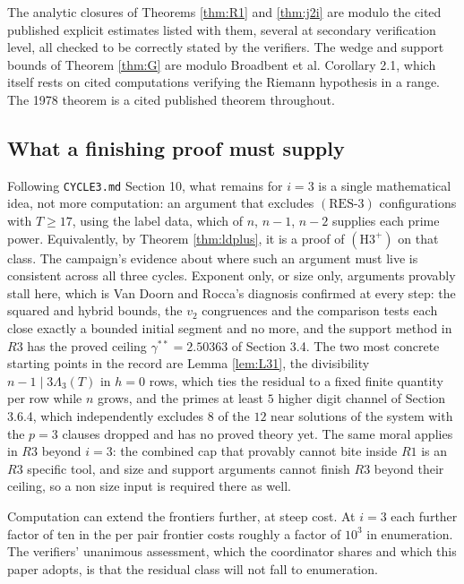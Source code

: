 \documentclass[11pt]{article}
\theoremstyle{remark}
\newcommand{\RESthree}{\ensuremath{\mathrm{(RES\text{-}3)}}}
\begin{document}
The analytic closures of Theorems \ref{thm:R1} and \ref{thm:j2i} are modulo the cited published explicit estimates listed with them, several at secondary verification level, all checked to be correctly stated by the verifiers. The wedge and support bounds of Theorem \ref{thm:G} are modulo Broadbent et al. Corollary 2.1, which itself rests on cited computations verifying the Riemann hypothesis in a range. The 1978 theorem is a cited published theorem throughout.

\subsection{What a finishing proof must supply}

Following \texttt{CYCLE3.md} Section 10, what remains for $i=3$ is a single mathematical idea, not more computation: an argument that excludes \RESthree{} configurations with $T\ge 17$, using the label data, which of $n$, $n-1$, $n-2$ supplies each prime power. Equivalently, by Theorem \ref{thm:ldplus}, it is a proof of $(\mathrm{H3^+})$ on that class. The campaign's evidence about where such an argument must live is consistent across all three cycles. Exponent only, or size only, arguments provably stall here, which is Van Doorn and Rocca's diagnosis confirmed at every step: the squared and hybrid bounds, the $v_2$ congruences and the comparison tests each close exactly a bounded initial segment and no more, and the support method in $R3$ has the proved ceiling $\gamma^{**}=2.50363$ of Section 3.4. The two most concrete starting points in the record are Lemma \ref{lem:L31}, the divisibility $n-1\mid 3\Lambda_3(T)$ in $h=0$ rows, which ties the residual to a fixed finite quantity per row while $n$ grows, and the primes at least $5$ higher digit channel of Section 3.6.4, which independently excludes $8$ of the $12$ near solutions of the system with the $p=3$ clauses dropped and has no proved theory yet. The same moral applies in $R3$ beyond $i=3$: the combined cap that provably cannot bite inside $R1$ is an $R3$ specific tool, and size and support arguments cannot finish $R3$ beyond their ceiling, so a non size input is required there as well.

Computation can extend the frontiers further, at steep cost. At $i=3$ each further factor of ten in the per pair frontier costs roughly a factor of $10^3$ in enumeration. The verifiers' unanimous assessment, which the coordinator shares and which this paper adopts, is that the residual class will not fall to enumeration.
\end{document}
